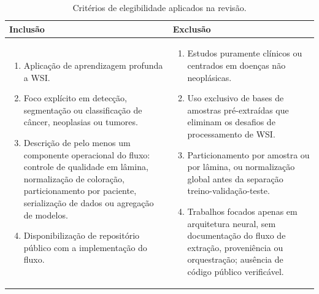 \begin{table}[!htb]
\centering
\caption{Critérios de elegibilidade aplicados na revisão.}
\label{tab:revisao_sistematica_criterios}
\scriptsize
\renewcommand{\arraystretch}{1.15}
\begin{tabular}{>{\raggedright\arraybackslash}p{6.35cm}
                >{\raggedright\arraybackslash}p{6.35cm}}
\toprule
Inclusão & Exclusão \\
\midrule
\begin{enumerate}[leftmargin=*, nosep, label=\arabic*.]
    \item Aplicação de aprendizagem profunda a WSI.
    \item Foco explícito em detecção, segmentação ou classificação de câncer, neoplasias ou tumores.
    \item Descrição de pelo menos um componente operacional do fluxo: controle de qualidade em lâmina, normalização de coloração, particionamento por paciente, serialização de dados ou agregação de modelos.
    \item Disponibilização de repositório público com a implementação do fluxo.
\end{enumerate}
&
\begin{enumerate}[leftmargin=*, nosep, label=\arabic*.]
    \item Estudos puramente clínicos ou centrados em doenças não neoplásicas.
    \item Uso exclusivo de bases de amostras pré-extraídas que eliminam os desafios de processamento de WSI.
    \item Particionamento por amostra ou por lâmina, ou normalização global antes da separação treino-validação-teste.
    \item Trabalhos focados apenas em arquitetura neural, sem documentação do fluxo de extração, proveniência ou orquestração; ausência de código público verificável.
\end{enumerate}
\\
\bottomrule
\end{tabular}
\normalsize
\end{table}


